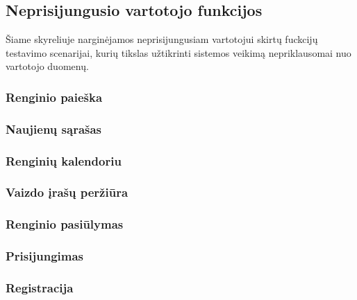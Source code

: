 \documentclass{VUMIFPSkursinis}
\begin{document}
		\subsection{Neprisijungusio vartotojo funkcijos}
		Šiame skyreliuje narginėjamos neprisijungusiam vartotojui skirtų fuckcijų testavimo scenarijai, kurių tikslas užtikrinti sistemos veikimą nepriklausomai nuo vartotojo duomenų. 
			
			\subsubsection{Renginio paieška}
			\subsubsection{Naujienų sąrašas}
			\subsubsection{Renginių kalendoriu}
			\subsubsection{Vaizdo įrašų peržiūra}
			\subsubsection{Renginio pasiūlymas}
			\subsubsection{Prisijungimas}
			\subsubsection{Registracija}
		
\end{document}
